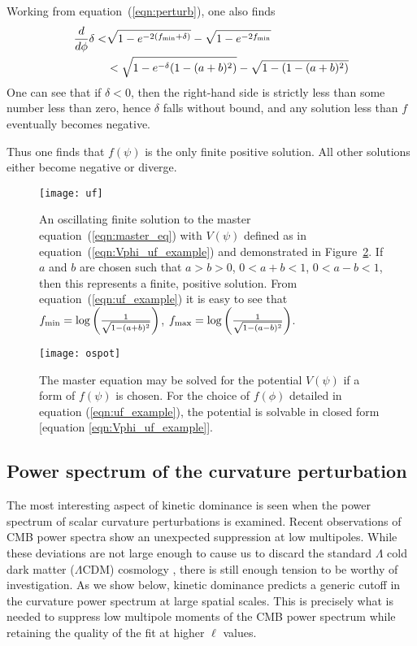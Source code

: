 Working from equation~(\ref{eqn:perturb}), one also finds
%
\begin{align}
  \frac{d}{d\phi}\delta 
  <&
  \sqrt{1-e^{-2(f_\mathrm{min}+\delta)}} -\sqrt{1-e^{-2f_\mathrm{min}}} 
  \nonumber
  \\
  &<
  \sqrt{1-e^{-\delta}({1-(a+b)^2})} - \sqrt{1-({1-(a+b)^2})}
\end{align}
%
One can see that if $\delta<0$, then the right-hand side is strictly less than some number less than zero, hence $\delta$ falls without bound, and any solution less than $f$ eventually becomes negative. 

Thus one finds that $f(\psi)$ is the only finite positive solution.  All other solutions either become negative or diverge.





%
\begin{figure}
  \centering
  \texttt{[image: uf]}
  \caption{An oscillating finite solution to the master equation~\protect(\ref{eqn:master_eq}) with $V(\psi)$ defined as in equation~\protect(\ref{eqn:Vphi_uf_example}) and demonstrated in Figure~\protect\ref{fig:figure_ospot}. If $a$ and $b$ are chosen such that $a>b>0$, $0<a+b<1$, $0<a-b<1$, then this represents a finite, positive solution.  From equation~\protect(\ref{eqn:uf_example}) it is easy to see that $f_\mathrm{min} = \log\left(\frac{1}{\sqrt{1-(a+b)^2}}\right)$, $f_\mathrm{max}=\log\left(\frac{1}{\sqrt{1-(a-b)^2}}\right)$.  }
  \label{fig:figure_uf}
\end{figure}
%

%
\begin{figure}
  \centering
  \texttt{[image: ospot]}
  \caption{The master equation may be solved for the potential $V(\psi)$ if a form of $f(\psi)$ is chosen. For the choice of $f(\phi)$ detailed in equation (\protect\ref{eqn:uf_example}), the potential is solvable in closed form [equation \protect\ref{eqn:Vphi_uf_example}].  }
  \label{fig:figure_ospot}
\end{figure}
%





\subsection{Power spectrum of the curvature perturbation}
\label{sec:powspec}

The most interesting aspect of kinetic dominance is seen when the power spectrum of scalar curvature perturbations is examined. Recent observations of CMB power spectra \citep{hinshaw_nine-year_2012,planck_collaboration_planck_2013} show an unexpected suppression at low multipoles. While these deviations are not large enough to cause us to discard the standard $\Lambda$ cold dark matter ($\Lambda$CDM) cosmology \citep{1998PhRvD..57.2207B,2000PhRvD..62l3513B,2004PhRvD..69f3516D}, there is still enough tension to be worthy of investigation.  As we show below, kinetic dominance predicts a generic cutoff in the curvature power spectrum at large spatial scales. This is precisely what is needed to suppress low multipole moments of the CMB power spectrum while retaining the quality of the fit at higher $\ell$ values.

